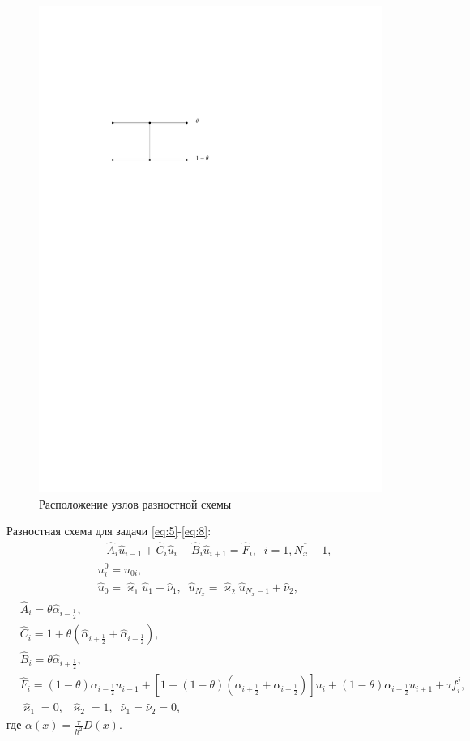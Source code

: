 \documentclass[
11pt,
master, %
subf, %
href, %
colorlinks=true, %
]{disser}
\newcommand*{\SR}[1]{\left[ #1 \right]}
\newcommand*{\Ap}[2]{\hat{#1}_{#2}}
\newcommand*{\Apr}[2]{#1_{#2}}
\begin{document}
\begin{figure}[h]
  \centering
  \includegraphics[width=0.5\linewidth]{pic1}
  \caption{Расположение узлов разностной схемы}\label{ris:1}
\end{figure}

Разностная схема для задачи  \eqref{eq:5}-\eqref{eq:8}:
\begin{align}
        &-\Ap{A}{i} \Ap{u}{i-1} + \Ap{C}{i} \Ap{u}{i} - \Ap{B}{i} \Ap{u}{i+1} = \Ap{F}{i}, \;\; i = \overline{1,N_{x}-1}, \label{eq:9.0}\\
        &u^0_i = u_{0i}, \label{eq:9.1}\\
        &\Ap{u}{0} = \Ap{\varkappa}{1} \Ap{u}{1} + \Ap{\nu}{1},\;\; \Ap{u}{N_{x}} = \Ap{\varkappa}{2} \Ap{u}{N_{x} -1} + \Ap{\nu}{2}, \label{eq:9.2}
\end{align}
\begin{align}
        &\Ap{A}{i} = \theta \Ap{\alpha}{i - \frac{1}{2}}, \label{eq:10.1}\\
        &\Ap{C}{i} = 1 + \theta \left(\Ap{\alpha}{i + \frac{1}{2}} + \Ap{\alpha}{i - \frac{1}{2}}\right), \label{eq:10.2}\\
        &\Ap{B}{i} = \theta \Ap{\alpha}{i + \frac{1}{2}}, \label{eq:10.3}\\
        &\Ap{F}{i} = (1 - \theta) \Apr{\alpha}{i - \frac{1}{2}} \Apr{u}{i-1} + \SR{1 - (1 - \theta) \left(\Apr{\alpha}{i + \frac{1}{2}} + \Apr{\alpha}{i - \frac{1}{2}}\right)} \Apr{u}{i} + (1 - \theta) \Apr{\alpha}{i + \frac{1}{2}} \Apr{u}{i+1} + \tau f_{i}^{j}, \label{eq:10.4}\\
        &\Ap{\varkappa}{1} = 0, \;\; \Ap{\varkappa}{2} = 1, \;\; \Ap{\nu}{1} = \Ap{\nu}{2} = 0, \label{eq:10.5}
\end{align}
где $\displaystyle \alpha(x) = \frac{\tau}{h^2} D(x)$.
\end{document}

